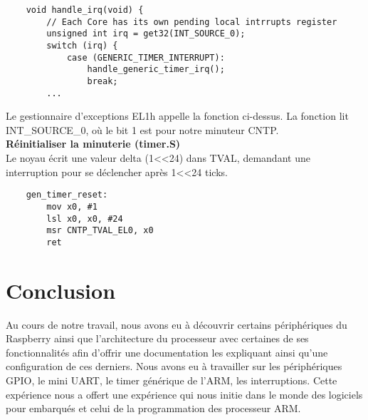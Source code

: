 \documentclass[12pt,a4paper,oneside]{book}
\begin{document}
\begin{lstlisting}
	void handle_irq(void) {
    	// Each Core has its own pending local intrrupts register
    	unsigned int irq = get32(INT_SOURCE_0);
    	switch (irq) {
        	case (GENERIC_TIMER_INTERRUPT):
            	handle_generic_timer_irq();
        		break;
    	...
\end{lstlisting}
Le gestionnaire d'exceptions EL1h appelle la fonction ci-dessus. La fonction lit INT\_SOURCE\_0, où le bit 1 est pour notre minuteur CNTP.\\

\textbf{Réinitialiser la minuterie (timer.S)}\\
Le noyau écrit une valeur delta (1<<24) dans TVAL, demandant une interruption pour se déclencher après 1<<24 ticks.\\

\begin{lstlisting}
	gen_timer_reset:
    	mov x0, #1
		lsl x0, x0, #24 
		msr CNTP_TVAL_EL0, x0
    	ret
\end{lstlisting}

\chapter{Conclusion}
Au cours de notre travail, nous avons eu à découvrir certains périphériques du Raspberry ainsi que l'architecture du processeur avec certaines de ses fonctionnalités afin d'offrir une documentation les expliquant ainsi qu'une configuration de ces derniers. Nous avons eu à travailler sur les périphériques GPIO, le mini UART, le timer générique de l'ARM, les interruptions. Cette expérience nous a offert une expérience qui nous initie dans le monde des logiciels pour embarqués et celui de la programmation des processeur ARM. 
\end{document}
